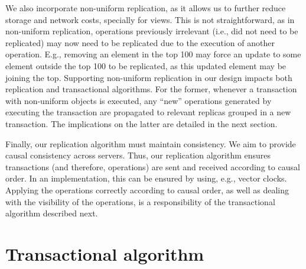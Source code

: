 We also incorporate non-uniform replication, as it allows us to further reduce storage and network costs, specially for views.
This is not straightforward, as in non-uniform replication,
operations previously irrelevant (i.e., did not need to be replicated) may now need to be replicated due to the execution of another operation.
E.g., removing an element in the top 100 may force an update to some element outside the top 100 to be replicated, as this updated element may be joining the top.
Supporting non-uniform replication in our design impacts both replication and transactional algorithms.
For the former, whenever a transaction with non-uniform objects is executed, any ``new'' operations generated by executing the transaction are propagated to relevant replicas grouped in a new transaction.
The implications on the latter are detailed in the next section.

Finally, our replication algorithm must maintain consistency.
We aim to provide causal consistency across servers.
Thus, our replication algorithm ensures transactions (and therefore, operations) are sent and received according to causal order.
In an implementation, this can be ensured by using, e.g., vector clocks.
Applying the operations correctly according to causal order, as well as dealing with the visibility of the operations, is a responsibility of the transactional algorithm described next.

\section{Transactional algorithm}
\label{sec:transactional_algorithm}

